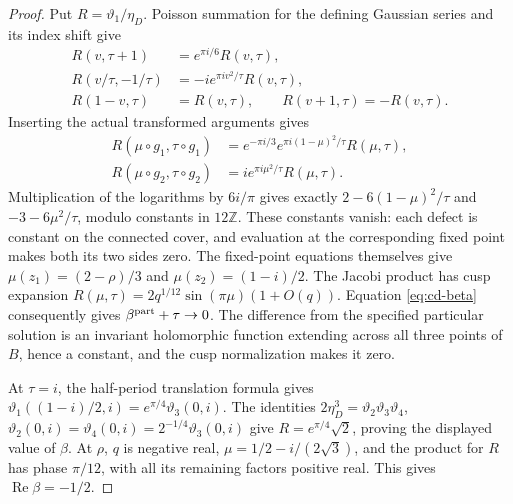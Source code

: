 \begin{proof}
Put \(R=\vartheta_1/\eta_D\). Poisson summation for the defining Gaussian
series and its index shift give
\[
 \begin{aligned}
 R(v,\tau+1)&=e^{\pi i/6}R(v,\tau),\\
 R(v/\tau,-1/\tau)&=-i e^{\pi iv^2/\tau}R(v,\tau),\\
 R(1-v,\tau)&=R(v,\tau),\qquad R(v+1,\tau)=-R(v,\tau).
 \end{aligned}
\]
Inserting the actual transformed arguments gives
\[
 \begin{aligned}
 R(\mu\circ g_1,\tau\circ g_1)
 &=e^{-\pi i/3}e^{\pi i(1-\mu)^2/\tau}R(\mu,\tau),\\
 R(\mu\circ g_2,\tau\circ g_2)
 &=i e^{\pi i\mu^2/\tau}R(\mu,\tau).
 \end{aligned}
\]
Multiplication of the logarithms by \(6i/\pi\) gives exactly
\(2-6(1-\mu)^2/\tau\) and \(-3-6\mu^2/\tau\), modulo constants in
\(12\mathbb Z\). These constants vanish: each defect is constant on the
connected cover, and evaluation at the corresponding fixed point makes
both its two sides zero. The fixed-point equations themselves give
\(\mu(z_1)=(2-\rho)/3\) and \(\mu(z_2)=(1-i)/2\).
The Jacobi product has cusp expansion
\(R(\mu,\tau)=2q^{1/12}\sin(\pi\mu)(1+O(q))\).
Equation \eqref{eq:cd-beta} consequently gives
\(\beta^{\rm part}+\tau\to0\). The difference from the specified particular
solution is an invariant holomorphic function extending across all three
points of \(B\), hence a constant, and the cusp normalization makes it zero.

At \(\tau=i\), the half-period translation formula gives
\(\vartheta_1((1-i)/2,i)=e^{\pi/4}\vartheta_3(0,i)\).
The identities \(2\eta_D^3=\vartheta_2\vartheta_3\vartheta_4\),
\(\vartheta_2(0,i)=\vartheta_4(0,i)=2^{-1/4}\vartheta_3(0,i)\)
give \(R=e^{\pi/4}\sqrt2\), proving the displayed value of \(\beta\).
At \(\rho\), \(q\) is negative real, \(\mu=1/2-i/(2\sqrt3)\), and the
product for \(R\) has phase \(\pi/12\), with all its remaining factors
positive real. This gives \(\operatorname{Re}\beta=-1/2\).
\end{proof}

